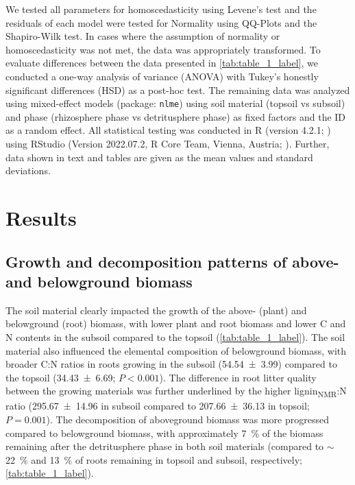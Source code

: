 We tested all parameters for homoscedasticity using Levene's test and the residuals of each model were tested for Normality using QQ-Plots and the Shapiro-Wilk test. In cases where the assumption of normality or homoscedasticity was not met, the data was appropriately transformed. To evaluate differences between the data presented in \cref{tab:table_1_label}, we conducted a one-way analysis of variance (ANOVA) with Tukey's honestly significant differences (HSD) as a post-hoc test. The remaining data was analyzed using mixed-effect models (package: \texttt{nlme}) using soil material (topsoil vs subsoil) and phase (rhizosphere phase vs detritusphere phase) as fixed factors and the ID as a random effect. All statistical testing was conducted in R (version 4.2.1; \citealp{RCoreTeam2008}) using RStudio (Version 2022.07.2, R Core Team, Vienna, Austria; \citealp{RStudioTeam2015}). Further, data shown in text and tables are given as the mean values and standard deviations.

\section{Results}
\subsection{Growth and decomposition patterns of above- and belowground
biomass}

The soil material clearly impacted the growth of the above- (plant) and belowground (root) biomass, with lower plant and root biomass and lower C and N contents in the subsoil compared to the topsoil (\cref{tab:table_1_label}). The soil material also influenced the elemental composition of belowground biomass, with broader C:N ratios in roots growing in the subsoil (\num{54.54 \pm 3.99}) compared to the topsoil (\num{34.43 \pm 6.69}; \(P < 0.001\)). The difference in root litter quality between the growing materials was further underlined by the higher lignin\textsubscript{NMR}:N ratio (\num{295.67 \pm 14.96} in subsoil compared to \num{207.66 \pm 36.13} in topsoil; \(P= 0.001\)). The decomposition of aboveground biomass was more progressed compared to belowground biomass, with approximately \SI{7}{\percent} of the biomass remaining after the detritusphere phase in both soil materials (compared to \(\sim\)\SI{22}{\percent} and \SI{13}{\percent} of roots remaining in topsoil and subsoil, respectively; \cref{tab:table_1_label}).

